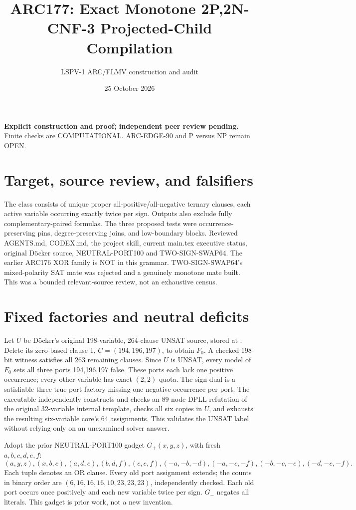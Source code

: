 \documentclass[11pt]{article}
\title{ARC177: Exact Monotone 2P,2N-CNF-3 Projected-Child Compilation}
\author{LSPV-1 ARC/FLMV construction and audit}
\date{25 October 2026}
\begin{document}
\maketitle
\textbf{Explicit construction and proof; independent peer review pending.}
Finite checks are COMPUTATIONAL. ARC-EDGE-90 and P versus NP remain OPEN.

\section{Target, source review, and falsifiers}
The class consists of unique proper all-positive/all-negative ternary clauses,
each active variable occurring exactly twice per sign. Outputs also exclude
fully complementary-paired formulas. The three proposed tests were
occurrence-preserving pins, degree-preserving joins, and low-boundary blocks.
Reviewed AGENTS.md, CODEX.md, the project skill, current main.tex executive
status, original D\"ocker source, NEUTRAL-PORT100 and TWO-SIGN-SWAP64.
The earlier ARC176 XOR family is NOT in this grammar. TWO-SIGN-SWAP64's
mixed-polarity SAT mate was rejected and a genuinely monotone mate built.
This was a bounded relevant-source review, not an exhaustive census.

\section{Fixed factories and neutral deficits}
Let \(U\) be D\"ocker's original 198-variable, 264-clause UNSAT source, stored at
.
Delete its zero-based clause 1, \(C=(194,196,197)\), to obtain \(F_0\). A checked
198-bit witness satisfies all 263 remaining clauses. Since \(U\) is UNSAT,
every model of \(F_0\) sets all three ports 194,196,197 false. These ports each
lack one positive occurrence; every other variable has exact \((2,2)\) quota.
The sign-dual is a satisfiable three-true-port factory missing one negative
occurrence per port. The executable independently constructs and checks an
89-node DPLL refutation of the original 32-variable internal template,
checks all six copies in \(U\), and exhausts the resulting six-variable
core's 64 assignments. This validates the UNSAT label without relying only
on an unexamined solver answer.

Adopt the prior NEUTRAL-PORT100 gadget \(G_+(x,y,z)\), with fresh \(a,b,c,d,e,f\):
\[
(a,y,z),(x,b,c),(a,d,e),(b,d,f),(c,e,f),
(-a,-b,-d),(-a,-c,-f),(-b,-c,-e),(-d,-e,-f).
\]
Each tuple denotes an OR clause. Every old port assignment extends; the
counts in binary order are \((6,16,16,16,10,23,23,23)\), independently checked.
Each old port occurs once positively and each new variable twice per sign.
\(G_-\) negates all literals. This gadget is prior work, not a new invention.
\end{document}
